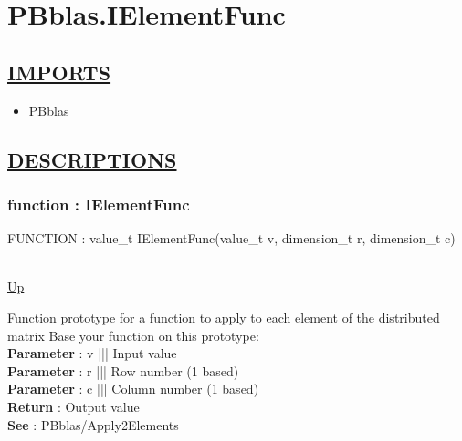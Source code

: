 \chapter*{PBblas.IElementFunc}
\hypertarget{PBblas.IElementFunc}{}

\section*{\underline{IMPORTS}}
\begin{itemize}
\item PBblas
\end{itemize}

\section*{\underline{DESCRIPTIONS}}
\subsection*{function : IElementFunc}
\hypertarget{ecldoc:pbblas.ielementfunc}{FUNCTION : value\_t IElementFunc(value\_t v, dimension\_t r, dimension\_t c)} \\
\hyperlink{ecldoc:}{Up} \\
\par
Function prototype for a function to apply to each element of the distributed matrix Base your function on this prototype: \\
\textbf{Parameter} : v ||| Input value \\
\textbf{Parameter} : r ||| Row number (1 based) \\
\textbf{Parameter} : c ||| Column number (1 based) \\
\textbf{Return} : Output value \\
\textbf{See} : PBblas/Apply2Elements \\
